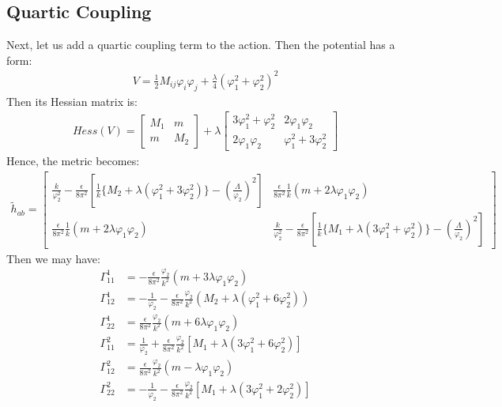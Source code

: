 \subsection{Quartic Coupling}
Next, let us add a quartic coupling term to the action. Then the potential has a form:
\begin{align}
    V= \frac{1}{2}M_{ij} \varphi_{i} \varphi_{j} + \frac{\lambda}{4} (\varphi_{1}^{2} + \varphi_{2}^{2})^{2}
\end{align}
Then its Hessian matrix is:
\begin{align}
    Hess(V) = \begin{bmatrix}
        M_{1} & m \\
        m & M_{2}
    \end{bmatrix}
    + \lambda
    \begin{bmatrix}
        3\varphi_{1}^{2} + \varphi_{2} ^{2} & 2\varphi_{1}\varphi_{2} \\
        2\varphi_{1}\varphi_{2} & \varphi_{1}^{2} + 3\varphi_{2} ^{2}
    \end{bmatrix}
\end{align}
Hence, the metric becomes:
\begin{align}
    \tilde{h}_{ab} = 
    \begin{bmatrix}
        \frac{k}{\varphi_{2}^{2}} - \frac{\epsilon}{8\pi^{2}}[\frac{1}{k} \lbrace M_{2} +\lambda (\varphi_{1}^{2} + 3\varphi_{2}^{2})\rbrace - (\frac{\Lambda}{\varphi_{2}})^{2}] & \frac{\epsilon}{8\pi^{2}}\frac{1}{k} (m+2\lambda\varphi_{1}\varphi_{2}) \\
        \frac{\epsilon}{8\pi^{2}}\frac{1}{k} (m+2\lambda\varphi_{1}\varphi_{2}) & \frac{k}{\varphi_{2}^{2}} - \frac{\epsilon}{8\pi^{2}}[\frac{1}{k} \lbrace M_{1} +\lambda (3\varphi_{1}^{2} + \varphi_{2}^{2})\rbrace - (\frac{\Lambda}{\varphi_{2}})^{2}]
    \end{bmatrix}
\end{align}
Then we may have:
\begin{align}
    \Gamma_{11}^{1} &= -\frac{\epsilon}{8\pi^{2}}\frac{\varphi_{2}}{k^{2}}(m+3\lambda\varphi_{1}\varphi_{2}) \\
    \Gamma_{12}^{1} &= -\frac{1}{\varphi_{2}} - \frac{\epsilon}{8\pi^{2}}\frac{\varphi_{2}}{k^{2}}(M_{2} + \lambda(\varphi_{1}^{2} + 6\varphi_{2}^{2})) \\
    \Gamma_{22}^{1} &= \frac{\epsilon}{8\pi^{2}} \frac{\varphi_{2}}{k^{2}}(m+6\lambda\varphi_{1}\varphi_{2})\\
    \Gamma_{11}^{2} &= \frac{1}{\varphi_{2}} + \frac{\epsilon}{8\pi^{2}}\frac{\varphi_{2}}{k^{2}}[M_{1} + \lambda (3\varphi_{1}^{2} + 6\varphi_{2}^{2})] \\
    \Gamma_{12}^{2} &= \frac{\epsilon}{8\pi^{2}} \frac{\varphi_{2}}{k^{2}}(m-\lambda\varphi_{1}\varphi_{2}) \\
    \Gamma_{22}^{2} &= -\frac{1}{\varphi_{2}} - \frac{\epsilon}{8\pi^{2}}\frac{\varphi_{2}}{k^{2}}[M_{1} + \lambda (3\varphi_{1}^{2} + 2\varphi_{2}^{2})]
\end{align}
